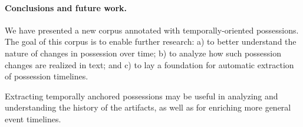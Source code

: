 




\paragraph{Conclusions and future work.}
We have presented a new corpus annotated with temporally-oriented possessions.
The goal of this corpus is to enable further research: a) to better understand the nature of changes in possession over time; b) to analyze how such possession changes are realized in text; and c) to lay a foundation for automatic extraction of possession timelines.

Extracting temporally anchored possessions may be useful in analyzing and understanding the history of the artifacts, as well as for enriching more general event timelines. 
